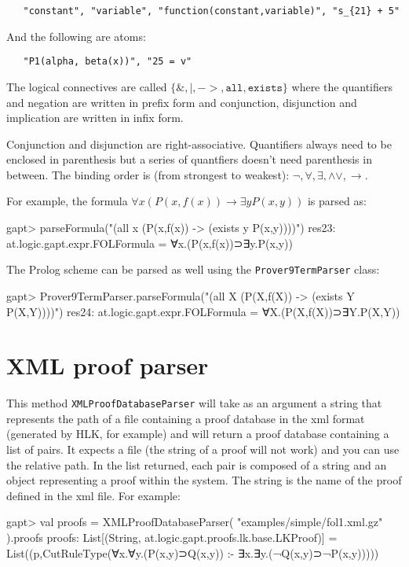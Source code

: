 \documentclass[a4paper,11pt]{article}
\renewcommand{\land}{\wedge}
\renewcommand{\lor}{\vee}
\begin{document}
\begin{appendix}
 \begin{lstlisting}
   "constant", "variable", "function(constant,variable)", "s_{21} + 5"
 \end{lstlisting}

And the following are atoms:

 \begin{lstlisting}
   "P1(alpha, beta(x))", "25 = v"
 \end{lstlisting}

The logical connectives are called $\{\mathtt{\&,|,->,all,exists}\}$ where
 the quantifiers and negation are written in prefix form and conjunction,
 disjunction and implication are written in infix form.

Conjunction and disjunction are right-associative. Quantifiers always need to
 be enclosed in parenthesis but a series of quantfiers doesn't need parenthesis
 in between. The binding order is (from strongest to weakest):
 $\mathtt{\neg,\forall,\exists,\land\lor,\rightarrow}$.


For example, the formula $\forall x (P(x,f(x)) \rightarrow \exists y P(x,y))$
 is parsed as:

\begin{clilisting}
gapt> parseFormula("(all x (P(x,f(x)) -> (exists y P(x,y))))")
res23: at.logic.gapt.expr.FOLFormula = ∀x.(P(x,f(x))⊃∃y.P(x,y))

\end{clilisting}

The Prolog scheme can be parsed as well using the \texttt{Prover9TermParser}
class:

\begin{clilisting}
gapt> Prover9TermParser.parseFormula("(all X (P(X,f(X)) -> (exists Y P(X,Y))))")
res24: at.logic.gapt.expr.FOLFormula = ∀X.(P(X,f(X))⊃∃Y.P(X,Y))

\end{clilisting}

\section{XML proof parser}\label{sec.fileio}

This method \texttt{XMLProofDatabaseParser} will take as an argument a string that represents the path of a file
containing a proof database in the xml format (generated by HLK, for example) and
will return a proof database containing a list 
of pairs. It expects a file (the string of a proof will not work) and you can use 
the relative path. In the list returned, each pair is composed of a string and 
an object representing a proof within the system. The string is the name of the 
proof defined in the xml file. For example:
%
\begin{clilisting}
gapt> val proofs = XMLProofDatabaseParser( "examples/simple/fol1.xml.gz" ).proofs
proofs: List[(String, at.logic.gapt.proofs.lk.base.LKProof)] = List((p,CutRuleType(∀x.∀y.(P(x,y)⊃Q(x,y)) :- ∃x.∃y.(¬Q(x,y)⊃¬P(x,y)))))


\end{clilisting}
\end{appendix}
\end{document}
